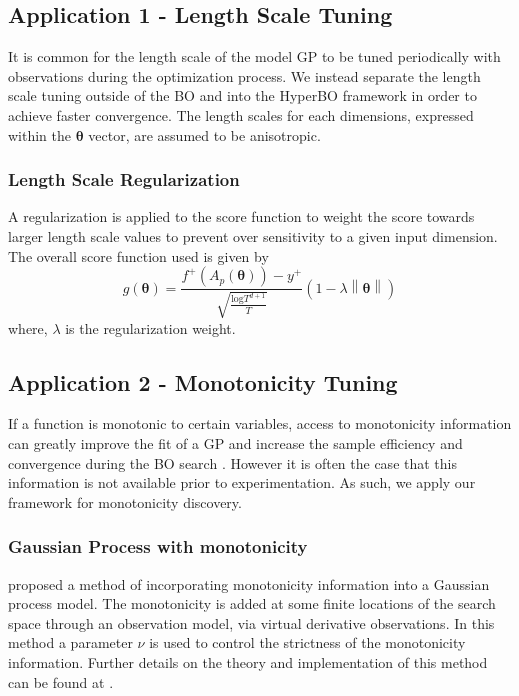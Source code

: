 \documentclass{article}
\begin{document}
\subsection{Application 1 - Length Scale Tuning}

It is common for the length scale of the model GP to be tuned periodically with observations during the optimization process. We instead separate the length scale tuning outside of the BO and into the HyperBO framework in order to achieve faster convergence. The length scales for each dimensions, expressed within the $\boldsymbol{\theta}$ vector, are assumed to be anisotropic.

\subsubsection{Length Scale Regularization}
A regularization is applied to the score function to weight the score towards larger length scale values to prevent over sensitivity to a given input dimension. The overall score function used is given by
\begin{equation}\label{eq:length_score}
g(\boldsymbol{\theta}) = \frac{f^{+}(A_{p}(\boldsymbol{\theta}))-y^{+}}{\sqrt{\frac{\text{log} T^{d+1}}{T}}}\left(1-\lambda\left\|\boldsymbol{\theta}\right\|\right)
\end{equation}
where, $\lambda$ is the regularization weight.

\subsection{Application 2 - Monotonicity Tuning}

If a function is monotonic to certain variables, access to monotonicity information can greatly improve the fit of a GP and increase the sample efficiency and convergence during the BO search \cite{Wang2018,Golchi2015,Li2018}. However it is often the case that this information is not available prior to experimentation. As such, we apply our framework for monotonicity discovery.

\subsubsection{Gaussian Process with monotonicity}

\cite{riihimaki2010gaussian} proposed a method of incorporating monotonicity information into a Gaussian process model. The monotonicity is added at some finite locations of the search space through an observation model, via virtual derivative observations. In this method a parameter $\nu$ is used to control the strictness of the monotonicity information. Further details on the theory and implementation of this method can be found at \cite{riihimaki2010gaussian}.
\end{document}
